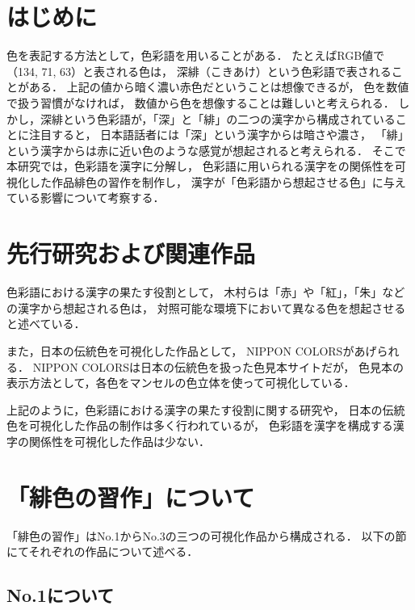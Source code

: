 \documentclass[a4j,twocolumn]{ujarticle} %
\newcommand{\workname}{緋色の習作}
\newcommand{\colorname}{色彩語}
\begin{document}
\maketitle
\thispagestyle{myheadings}

\section{はじめに}

色を表記する方法として，\colorname{}を用いることがある．
たとえばRGB値で（134, 71, 63）と表される色は，
深緋（こきあけ）という\colorname{}で表されることがある．
上記の値から暗く濃い赤色だということは想像できるが，
色を数値で扱う習慣がなければ，
数値から色を想像することは難しいと考えられる．
しかし，深緋という\colorname{}が，「深」と「緋」の二つの漢字から構成されていることに注目すると，
日本語話者には「深」という漢字からは暗さや濃さ，
「緋」という漢字からは赤に近い色のような感覚が想起されると考えられる．
そこで本研究では，\colorname{}を漢字に分解し，
\colorname{}に用いられる漢字をの関係性を可視化した作品\workname{}を制作し，
漢字が「\colorname{}から想起させる色」に与えている影響について考察する．

\section{先行研究および関連作品}

色彩語における漢字の果たす役割として，
木村ら\cite{Kimura1998}は「赤」や「紅」，「朱」などの漢字から想起される色は，
対照可能な環境下において異なる色を想起させると述べている．

また，日本の伝統色を可視化した作品として，
NIPPON COLORS\cite{NipponColors}があげられる．
NIPPON COLORSは日本の伝統色を扱った色見本サイトだが，
色見本の表示方法として，各色をマンセルの色立体を使って可視化している．

上記のように，色彩語における漢字の果たす役割に関する研究や，
日本の伝統色を可視化した作品の制作は多く行われているが，
色彩語を漢字を構成する漢字の関係性を可視化した作品は少ない．

\section{「\workname{}」について}

「\workname{}」はNo.1からNo.3の三つの可視化作品から構成される．
以下の節にてそれぞれの作品について述べる．

\subsection{No.1について}
\end{document}
